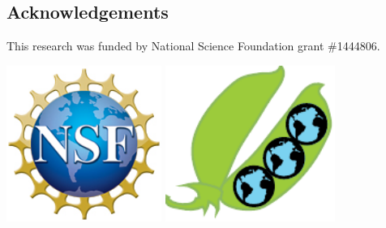 \documentclass[]{pagposter}
\begin{document}
\begin{multicols*}{3}
  \nocite{*} %


  \section*{Acknowledgements}
  
  \noindent This research was funded by National Science Foundation grant \#1444806.

  \begin{center}
    \includegraphics[height=2in]{nsf1.jpg} %
    \hspace{1in}
    \includegraphics[height=2in]{LegFedSiteLogo.pdf} %
  \end{center}
  
  
\end{multicols*}
\end{document}
